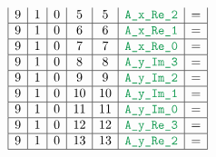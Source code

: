 \begin{figure}[h!]
\begin{adjustwidth}{-2cm}{-2cm}
{\[\begin{array}{|c|c|c|c|c|c|c|}
                    9                      & 1                                       & 0                                         & 5                      & 5                   & \locAXReTwo   & =                                                                    \\ \hline
                    9                      & 1                                       & 0                                         & 6                      & 6                   & \locAXReOne   & =                                                                    \\ \hline
                    9                      & 1                                       & 0                                         & 7                      & 7                   & \locAXReZero  & =                                                                    \\ \hline
                    9                      & 1                                       & 0                                         & 8                      & 8                   & \locAYImThree & =                                                                    \\ \hline
                    9                      & 1                                       & 0                                         & 9                      & 9                   & \locAYImTwo   & =                                                                    \\ \hline
                    9                      & 1                                       & 0                                         & 10                     & 10                  & \locAYImOne   & =                                                                    \\ \hline
                    9                      & 1                                       & 0                                         & 11                     & 11                  & \locAYImZero  & =                                                                    \\ \hline
                    9                      & 1                                       & 0                                         & 12                     & 12                  & \locAYReThree & =                                                                    \\ \hline
                    9                      & 1                                       & 0                                         & 13                     & 13                  & \locAYReTwo   & =                                                                    \\ \hline

\end{array}\]}
\end{adjustwidth}
\end{figure}

